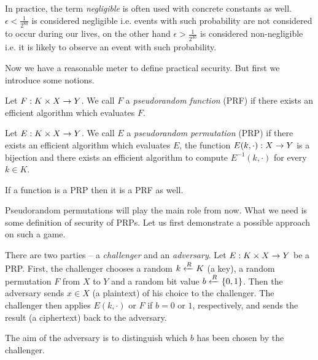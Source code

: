 \begin{note}
\label{note:neglconst}
	In practice, the term {\em negligible} is often used with concrete constants as well. $\epsilon<\frac{1}{2^{80}}$ is considered negligible i.e. events with such probability are not considered to occur during our lives, on the other hand $\epsilon>\frac{1}{2^{30}}$ is considered non-negligible i.e. it is likely to observe an event with such probability.
\end{note}

Now we have a reasonable meter to define practical security. But first we introduce some notions.

\begin{defn}   %
	Let $F: K\times X\rightarrow Y$. We call $F$ a {\em pseudorandom function} (PRF) if there exists an efficient algorithm which evaluates $F$.
\end{defn}

\begin{defn}
	Let $E: K\times X\rightarrow Y$. We call $E$ a {\em pseudorandom permutation} (PRP) if there exists an efficient algorithm which evaluates $E$, the function $E(k,\cdot): X\rightarrow Y$ is a bijection and there exists an efficient algorithm to compute $E^{-1}(k,\cdot)$ for every $k\in K$.
\end{defn}

\begin{note}
	If a function is a PRP then it is a PRF as well.
\end{note}

Pseudorandom permutations will play the main role from now. What we need is some definition of security of PRPs. Let us first demonstrate a possible approach on such a game.

\begin{game}
\label{game:prp}
	There are two parties -- a {\em challenger} and an {\em adversary}. Let $E:K\times X\rightarrow Y$ be a PRP. First, the challenger chooses a random $k\xleftarrow{R} K$ (a key), a random permutation $F$ from $X$ to $Y$ and a random bit value $b\xleftarrow{R}\{0,1\}$. Then the adversary sends $x\in X$ (a plaintext) of his choice to the challenger. The challenger then applies $E(k,\cdot)$ or $F$ if $b=0$ or $1$, respectively, and sends the result (a ciphertext) back to the adversary.
	
	The aim of the adversary is to distinguish which $b$ has been chosen by the challenger.
\end{game}

